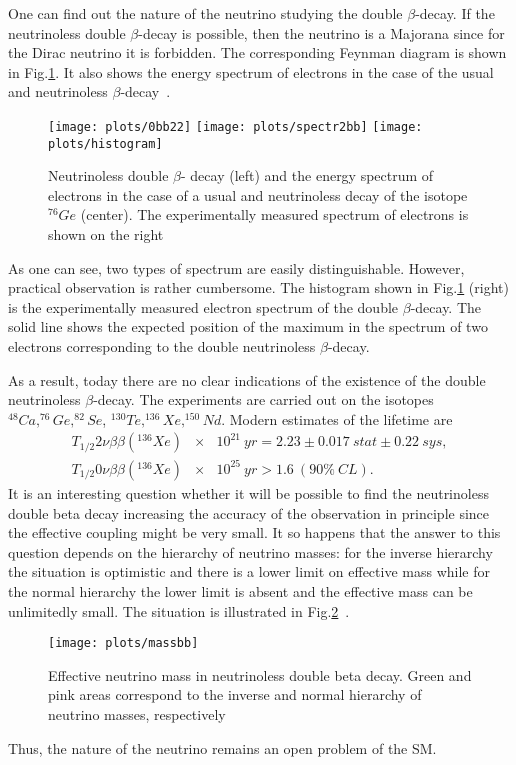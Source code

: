 \documentclass{cernyrep}
\begin{document}
One can find out the nature of the neutrino  studying the double $\beta$-decay. If the neutrinoless double $\beta$-decay is possible, then the neutrino is a Majorana since for the Dirac neutrino it is forbidden. The corresponding Feynman diagram is shown in Fig.\ref{02bb}. It also shows the energy spectrum of electrons in the case of the usual and neutrinoless  $\beta$-decay~\cite{02bb}. 
\begin{figure}[ht]
\begin{center}
\leavevmode
\centering
\texttt{[image: plots/0bb22]}
\texttt{[image: plots/spectr2bb]}
\texttt{[image: plots/histogram]}
\end{center}\caption{Neutrinoless double $\beta$- decay (left) and the energy spectrum of electrons in the case of a usual and neutrinoless decay of the isotope $^{76}Ge$ (center).  The experimentally measured spectrum of electrons is shown on the right~\cite{02bb_exp}}
\label{02bb}
\end{figure}
As one can see, two types of spectrum are easily distinguishable. However, practical observation is rather 
cumbersome.  The histogram shown in Fig.\ref{02bb} (right) is the experimentally measured electron spectrum of the double $\beta$-decay. The solid line shows the expected position of the maximum in the spectrum of two electrons corresponding to the double neutrinoless $\beta$-decay.

As a result, today there are no clear indications of the existence of the double neutrinoless  $\beta$-decay.  The experiments are carried out on the isotopes  $ ^{48}Ca, ^{76}Ge, ^{82}Se$, $^{130}Te, ^{136}Xe, ^{150}Nd.$  Modern estimates of the lifetime are~\cite{halflife}
\begin{eqnarray*}
T_{1/2}2\nu\beta\beta (^{136}Xe) &\times& 10^{21} \ yr = 2.23\pm 0.017\  stat \pm 0.22 \ sys ,  \\
T_{1/2}0\nu\beta\beta (^{136}Xe) &\times& 10^{25} \ yr > 1.6 \ (90\% \ CL).
\end{eqnarray*} 
It is an interesting question whether it will be possible to find the neutrinoless double beta decay
increasing the accuracy of the observation in principle since the effective coupling might be very small. It so happens that the answer to this question depends on the hierarchy of neutrino masses:
for the inverse hierarchy the situation is optimistic and there is a lower limit on effective mass while for the normal hierarchy the lower limit is absent and the effective mass can be unlimitedly small. The situation is illustrated in Fig.\ref{effectivemass}~\cite{effectivemass}.
\begin{figure}[ht]
\begin{center}
\texttt{[image: plots/massbb]}
\end{center}\caption{Effective neutrino mass in neutrinoless double beta decay. Green and pink areas correspond to the inverse and normal hierarchy of neutrino masses, respectively}
\label{effectivemass}
\end{figure}
Thus, the nature of the neutrino remains an open problem of the SM.
\end{document}
